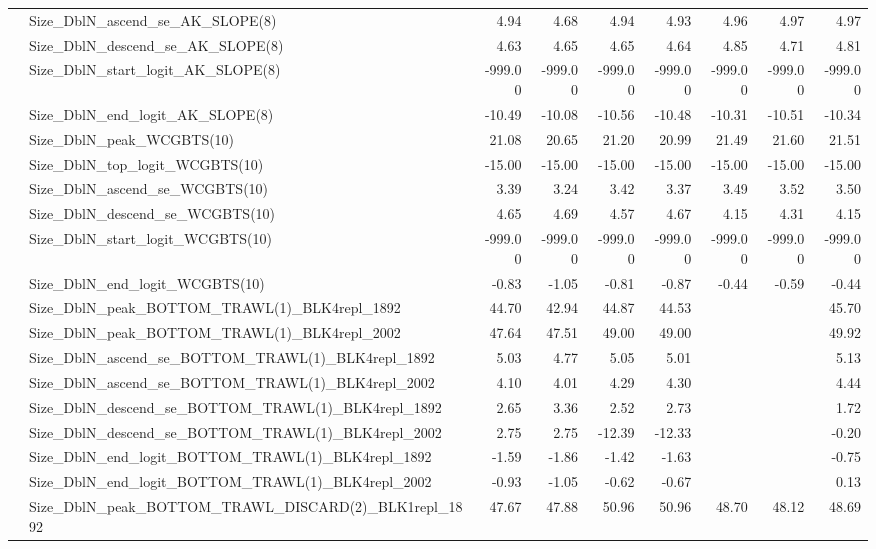 \documentclass[
]{scrartcl}
\begin{document}
\begin{landscape}
\begin{longtable}{llrrrrrrr}
 & Size\_DblN\_ascend\_se\_AK\_SLOPE(8) & 4.94 & 4.68 & 4.94 & 4.93 & 4.96 & 4.97 & 4.97 \\ 
 & Size\_DblN\_descend\_se\_AK\_SLOPE(8) & 4.63 & 4.65 & 4.65 & 4.64 & 4.85 & 4.71 & 4.81 \\ 
 & Size\_DblN\_start\_logit\_AK\_SLOPE(8) & -999.00 & -999.00 & -999.00 & -999.00 & -999.00 & -999.00 & -999.00 \\ 
 & Size\_DblN\_end\_logit\_AK\_SLOPE(8) & -10.49 & -10.08 & -10.56 & -10.48 & -10.31 & -10.51 & -10.34 \\ 
 & Size\_DblN\_peak\_WCGBTS(10) & 21.08 & 20.65 & 21.20 & 20.99 & 21.49 & 21.60 & 21.51 \\ 
 & Size\_DblN\_top\_logit\_WCGBTS(10) & -15.00 & -15.00 & -15.00 & -15.00 & -15.00 & -15.00 & -15.00 \\ 
 & Size\_DblN\_ascend\_se\_WCGBTS(10) & 3.39 & 3.24 & 3.42 & 3.37 & 3.49 & 3.52 & 3.50 \\ 
 & Size\_DblN\_descend\_se\_WCGBTS(10) & 4.65 & 4.69 & 4.57 & 4.67 & 4.15 & 4.31 & 4.15 \\ 
 & Size\_DblN\_start\_logit\_WCGBTS(10) & -999.00 & -999.00 & -999.00 & -999.00 & -999.00 & -999.00 & -999.00 \\ 
 & Size\_DblN\_end\_logit\_WCGBTS(10) & -0.83 & -1.05 & -0.81 & -0.87 & -0.44 & -0.59 & -0.44 \\ 
 & Size\_DblN\_peak\_BOTTOM\_TRAWL(1)\_BLK4repl\_1892 & 44.70 & 42.94 & 44.87 & 44.53 &  &  & 45.70 \\ 
 & Size\_DblN\_peak\_BOTTOM\_TRAWL(1)\_BLK4repl\_2002 & 47.64 & 47.51 & 49.00 & 49.00 &  &  & 49.92 \\ 
 & Size\_DblN\_ascend\_se\_BOTTOM\_TRAWL(1)\_BLK4repl\_1892 & 5.03 & 4.77 & 5.05 & 5.01 &  &  & 5.13 \\ 
 & Size\_DblN\_ascend\_se\_BOTTOM\_TRAWL(1)\_BLK4repl\_2002 & 4.10 & 4.01 & 4.29 & 4.30 &  &  & 4.44 \\ 
 & Size\_DblN\_descend\_se\_BOTTOM\_TRAWL(1)\_BLK4repl\_1892 & 2.65 & 3.36 & 2.52 & 2.73 &  &  & 1.72 \\ 
 & Size\_DblN\_descend\_se\_BOTTOM\_TRAWL(1)\_BLK4repl\_2002 & 2.75 & 2.75 & -12.39 & -12.33 &  &  & -0.20 \\ 
 & Size\_DblN\_end\_logit\_BOTTOM\_TRAWL(1)\_BLK4repl\_1892 & -1.59 & -1.86 & -1.42 & -1.63 &  &  & -0.75 \\ 
 & Size\_DblN\_end\_logit\_BOTTOM\_TRAWL(1)\_BLK4repl\_2002 & -0.93 & -1.05 & -0.62 & -0.67 &  &  & 0.13 \\ 
 & Size\_DblN\_peak\_BOTTOM\_TRAWL\_DISCARD(2)\_BLK1repl\_1892 & 47.67 & 47.88 & 50.96 & 50.96 & 48.70 & 48.12 & 48.69 \\ 

\end{longtable}
\end{landscape}
\end{document}
